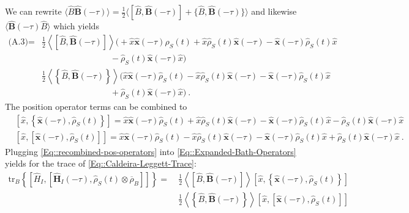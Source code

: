 	We can rewrite $\langle \hat{B} \boldsymbol{\hat{B}}(-\tau) \rangle = \frac{1}{2}	\langle [\hat{B}, \boldsymbol{\hat{B}}(-\tau)] + \{ \hat{B},  \boldsymbol{\hat{B}}(-\tau)\} \rangle$ and likewise $ \langle \boldsymbol{\hat{B}}(-\tau) \hat{B}  \rangle$ which yields
	\begin{equation} \label{Eq::Expanded-Bath-Operators}
		\begin{split}
			\text{(A.3)} =	&\frac{1}{2} \left\langle \left[\hat{B}, \boldsymbol{\hat{B}}(-\tau) \right]  \right \rangle \Big ( +\hat{x} \boldsymbol{\hat{x}}(-\tau) \hat{\rho}_S(t) + \hat{x} \hat{\rho}_S(t) \boldsymbol{\hat{x}}(-\tau) - \boldsymbol{\hat{x}}(-\tau) \hat{\rho}_S(t) \hat{x}  \\
			& \qquad \qquad \qquad \qquad -  \hat{\rho}_S(t) \boldsymbol{\hat{x}}(-\tau) \hat{x} \Big ) \\
			& \frac{1}{2} \left\langle \left \{\hat{B}, \boldsymbol{\hat{B}}(-\tau)\right \}  \right \rangle \Big ( \hat{x} \boldsymbol{\hat{x}}(-\tau) \hat{\rho}_S(t) - \hat{x} \hat{\rho}_S(t) \boldsymbol{\hat{x}}(-\tau) - \boldsymbol{\hat{x}}(-\tau) \hat{\rho}_S(t) \hat{x} \\
			& \qquad \qquad \qquad \qquad + \hat{\rho}_S(t) \boldsymbol{\hat{x}}(-\tau) \hat{x} \Big) ~.
		\end{split}
	\end{equation}
	The position operator terms can be combined to
	\begin{align} \label{Eq::recombined-pos-operators}
		&\left[\hat{x}, \left\{\boldsymbol{\hat{x}}(-\tau),  \hat{\rho}_S(t)\right\}\right] =	\hat{x} \boldsymbol{\hat{x}}(-\tau) \hat{\rho}_S(t) + \hat{x} \hat{\rho}_S(t) \boldsymbol{\hat{x}}(-\tau) - \boldsymbol{\hat{x}}(-\tau) \hat{\rho}_S(t) \hat{x}
		-  \hat{\rho}_S(t) \boldsymbol{\hat{x}}(-\tau) \hat{x} \\
		&\left[\hat{x}, \left[\boldsymbol{\hat{x}}(-\tau),  \hat{\rho}_S(t)\right] \right] =	\hat{x} \boldsymbol{\hat{x}}(-\tau) \hat{\rho}_S(t) - \hat{x} \hat{\rho}_S(t) \boldsymbol{\hat{x}}(-\tau) - \boldsymbol{\hat{x}}(-\tau) \hat{\rho}_S(t) \hat{x}
		+  \hat{\rho}_S(t) \boldsymbol{\hat{x}}(-\tau) \hat{x}~.
	\end{align}
	Plugging \autoref{Eq::recombined-pos-operators} into \autoref{Eq::Expanded-Bath-Operators} yields for the trace of \autoref{Eq::Caldeira-Leggett-Trace}:
	\begin{equation}
		\begin{split}
			\text{tr}_B \left\{  \left[{\hat{H}}_I, \left[{\boldsymbol{\hat{H}}}_I(- \tau), {\hat{\rho}}_S(t) \otimes \overline{\rho}_B \right]\right]  \right\} =	~&\frac{1}{2} \left\langle \left[\hat{B}, \boldsymbol{\hat{B}}(-\tau) \right]  \right \rangle \left[\hat{x}, \left\{\boldsymbol{\hat{x}}(-\tau),  \hat{\rho}_S(t)\right\}\right] \\
			& \frac{1}{2} \left\langle \left \{\hat{B}, \boldsymbol{\hat{B}}(-\tau)\right \}  \right \rangle \left[\hat{x}, \left[\boldsymbol{\hat{x}}(-\tau),  \hat{\rho}_S(t)\right] \right]
		\end{split}
	\end{equation}
